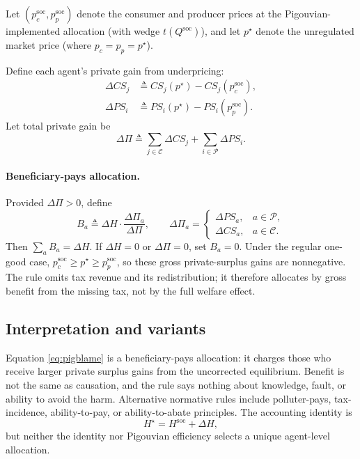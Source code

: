 \documentclass[journal, a4paper]{IEEEtran}
\begin{document}
Let $(p_c^{\text{soc}},p_p^{\text{soc}})$ denote the consumer and producer prices at the Pigouvian-implemented allocation (with wedge $t(Q^{\text{soc}})$), and let $p^\star$ denote the unregulated market price (where $p_c=p_p=p^\star$).

Define each agent's private gain from underpricing:
\begin{align}
\Delta CS_j &\triangleq CS_j(p^\star)-CS_j(p_c^{\text{soc}}),\\
\Delta PS_i &\triangleq PS_i(p^\star)-PS_i(p_p^{\text{soc}}).
\end{align}
Let total private gain be
\begin{equation}
\Delta \Pi \triangleq \sum_{j\in \mathcal{C}}\Delta CS_j + \sum_{i\in \mathcal{P}}\Delta PS_i.
\end{equation}

\paragraph{Beneficiary-pays allocation.}
Provided $\Delta\Pi>0$, define
\begin{equation}
B_a \triangleq
\Delta H\cdot \frac{\Delta \Pi_a}{\Delta \Pi},
\qquad
\Delta \Pi_a=
\begin{cases}
\Delta PS_a, & a\in \mathcal{P},\\
\Delta CS_a, & a\in \mathcal{C}.
\end{cases}
\label{eq:pigblame}
\end{equation}
Then $\sum_a B_a=\Delta H$. If $\Delta H=0$ or $\Delta\Pi=0$, set $B_a=0$. Under the regular one-good case, $p_c^{\text{soc}}\ge p^\star\ge p_p^{\text{soc}}$, so these gross private-surplus gains are nonnegative. The rule omits tax revenue and its redistribution; it therefore allocates by gross benefit from the missing tax, not by the full welfare effect.

\subsection{Interpretation and variants}
Equation \eqref{eq:pigblame} is a beneficiary-pays allocation: it charges those who receive larger private surplus gains from the uncorrected equilibrium. Benefit is not the same as causation, and the rule says nothing about knowledge, fault, or ability to avoid the harm. Alternative normative rules include polluter-pays, tax-incidence, ability-to-pay, or ability-to-abate principles. The accounting identity is
\begin{equation}
H^\star = H^{\text{soc}} + \Delta H,
\end{equation}
but neither the identity nor Pigouvian efficiency selects a unique agent-level allocation.
\end{document}
